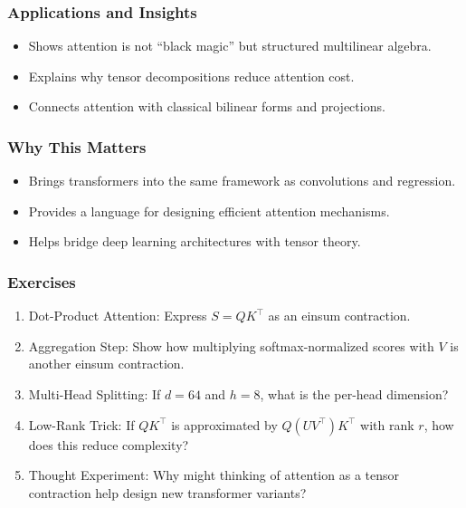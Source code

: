 \documentclass[
  letterpaper,
  DIV=11,
  numbers=noendperiod]{scrreprt}
\providecommand{\tightlist}{%
  \setlength{\itemsep}{0pt}\setlength{\parskip}{0pt}}
\begin{document}
\subsubsection{Applications and
Insights}\label{applications-and-insights}

\begin{itemize}
\tightlist
\item
  Shows attention is not ``black magic'' but structured multilinear
  algebra.
\item
  Explains why tensor decompositions reduce attention cost.
\item
  Connects attention with classical bilinear forms and projections.
\end{itemize}

\subsubsection{Why This Matters}\label{why-this-matters-50}

\begin{itemize}
\tightlist
\item
  Brings transformers into the same framework as convolutions and
  regression.
\item
  Provides a language for designing efficient attention mechanisms.
\item
  Helps bridge deep learning architectures with tensor theory.
\end{itemize}

\subsubsection{Exercises}\label{exercises-64}

\begin{enumerate}
\def\labelenumi{\arabic{enumi}.}
\item
  Dot-Product Attention: Express \(S = QK^\top\) as an einsum
  contraction.
\item
  Aggregation Step: Show how multiplying softmax-normalized scores with
  \(V\) is another einsum contraction.
\item
  Multi-Head Splitting: If \(d=64\) and \(h=8\), what is the per-head
  dimension?
\item
  Low-Rank Trick: If \(QK^\top\) is approximated by \(Q(UV^\top)K^\top\)
  with rank \(r\), how does this reduce complexity?
\item
  Thought Experiment: Why might thinking of attention as a tensor
  contraction help design new transformer variants?
\end{enumerate}
\end{document}
